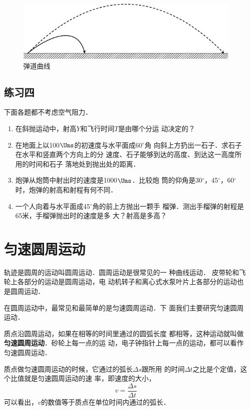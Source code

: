 \begin{figure}[htbp]
    \centering
    \includegraphics{fig/A/4-15.pdf}
    \caption{弹道曲线}\label{fig_A_4-15}
\end{figure}

\subsection*{练习四}
    下面各题都不考虑空气阻力．
\begin{enumerate}
 \item 在斜抛运动中，射高$Y$和飞行时间$T$是由哪个分运
动决定的？
 \item 在地面上以100$\Ums$的初速度与水平面成60$^\circ$角
向斜上方扔出一石子．求石子在水平和竖直两个方向上的分
速度、石子能够到达的高度、到达这一高度所用的时间和石子
落地处到抛出处的距离．
  \item 炮弹从炮筒中射出时的速度是1000$\Ums$．比较炮
筒的仰角是30$^\circ$，45$^\circ$，60$^\circ$时，炮弹的射高和射程有何不同．
  \item 一个人向着与水平面成45$^\circ$角的前上方抛出一颗手
榴弹．测出手榴弹的射程是65米，手榴弹抛出时的速度是多
大？射高是多高？
\end{enumerate}

\section{匀速圆周运动}
    轨迹是圆周的运动叫圆周运动．圆周运动是很常见的一
种曲线运动．
皮带轮和飞轮上各部分的运动是圆周运动，电
动机转子和离心式水泵叶片上各部分的运动也是圆周运动．

    在圆周运动中，最常见和最简单的是匀速圆周运动．下
面我们主要研究匀速圆周运动．

    质点沿圆周运动，如果在相等的时间里通过的圆弧长度
都相等，这种运动就叫做\textbf{匀速圆周运动}．砂轮上每一点的运
动，电子钟指针上每一点的运动，都可以看作匀速圆周运动．

    质点做匀速圆周运动的时候，它通过的弧长$\Delta s$跟所用
的时间$\Delta t$之比是个定值，这个比值就是匀速圆周运动的速
率，即速度的大小，
\[v=\frac{\Delta s}{\Delta t} \]
可以看出，$v$的数值等于质点在单位时间内通过的弧长．

